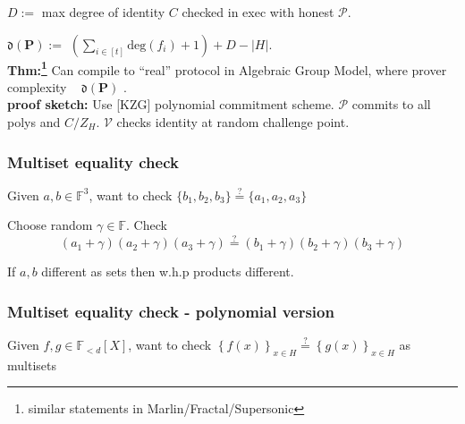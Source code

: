 \documentclass[shadesubsections,compress,14pt,mathserif]{beamer}
\newcommand{\prot}{\mathbf{P}}
\newcommand{\aggdeg}[1]{\mathfrak{d}(#1)}
\renewcommand{\deg}{\mathrm{deg}}
\newcommand{\F}{\ensuremath{\mathbb F}}
\newcommand{\sett}[2]{\ensuremath{\left\{#1\right\}_{#2}}}
\newcommand{\defeq}{\ensuremath{:=}}
\newcommand{\ver}{\ensuremath{\mathcal{V}}}
\newcommand{\prv}{\ensuremath{\mathcal{P}}}
\newcommand{\polysofdeg}[1]{\F_{< #1}[X]}
\begin{document}
\begin{frame}

$D\defeq$ max degree of identity $C$ checked in exec with honest $\prv$.\\
 \vspace{0.2in}

 $\aggdeg{\prot}\defeq$ $\left(\sum_{i\in [t]} \deg(f_i)+1\right)+D -|H|$.\pause \\
 \vspace{0.2in}
\textbf{Thm:\footnote{similar statements in Marlin/Fractal/Supersonic}}
Can compile to ``real'' protocol in Algebraic Group Model, where prover complexity ~ $\aggdeg{\prot}$ .\\ \pause
 \vspace{0.2in}
\textbf{proof sketch:}
 Use [KZG] polynomial commitment scheme. $\prv$ commits to all polys and $C/Z_H$. $\ver$ checks identity at random challenge point. 
\end{frame}


\begin{frame}
\frametitle{Multiset equality check}
Given $a,b\in \F^3$, want to check $\{b_1,b_2,b_3\} \stackrel{?}{=} \{a_1,a_2,a_3\}$ \\ \pause
 \vspace{0.2in}

  
 Choose random $\gamma\in \F$. Check
  \[(a_1 + \gamma)(a_2+ \gamma)(a_3 + \gamma) \stackrel{?}{=} (b_1+\gamma)(b_2+\gamma)(b_3+\gamma)\]\pause

 \vspace{0.2in}
 If $a,b$ different as sets then w.h.p products different.\pause
 
\end{frame}



\begin{frame}
\frametitle{Multiset equality check - polynomial version}
Given $f,g\in \polysofdeg{d}$, want to check $\sett{f(x)}{x\in H} \stackrel{?}{=} \sett{g(x)}{x\in H}$ as multisets \\ 
 
\end{frame}
\end{document}
